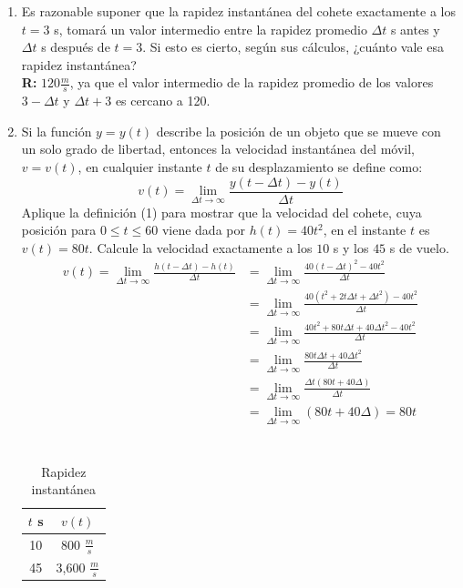 \documentclass[12pt]{article}
\begin{document}
\begin{enumerate}
\item Es razonable suponer que la rapidez instantánea del cohete exactamente a los $t = 3$ s, tomará un valor intermedio entre la rapidez promedio $\Delta t$ s antes y $\Delta t$ s después de $t = 3$. Si esto es cierto, según sus cálculos, ¿cuánto vale esa rapidez instantánea?\\
{\bf R:} $120 \frac{m}{s}$, ya que el valor intermedio de la rapidez promedio de los valores $3- \Delta t$ y $\Delta t +3$ es cercano a 120.
\item Si la función $y = y(t)$ describe la posición de un objeto que se mueve con un solo grado de libertad, entonces la velocidad instantánea del móvil, $v = v(t)$, en cualquier instante $t$ de su desplazamiento se define como:
  \begin{equation}
    v(t) = \lim_{\Delta t \rightarrow \infty}\frac{y(t - \Delta t) - y(t)}{\Delta t}
  \end{equation}
  Aplique la definición (1) para mostrar que la velocidad del cohete, cuya posición para $0 \leq t \leq 60$ viene dada por $h(t) = 40t^2$, en el instante $t$ es $v(t) = 80t$. Calcule la velocidad exactamente a los $10$ s y los $45$ s de vuelo.
\begin{align*}
v(t) = \lim_{\Delta t \rightarrow \infty}\frac{h(t - \Delta t) - h(t)}{\Delta t}&= \lim_{\Delta t \rightarrow \infty}\frac{40(t - \Delta t)^2 - 40t^2}{\Delta t}\\
&=\lim_{\Delta t \rightarrow \infty}\frac{40(t^2+2t\Delta t + \Delta t^2) - 40t^2}{\Delta t}\\
&=\lim_{\Delta t \rightarrow \infty}\frac{40t^2+80t\Delta t + 40\Delta t^2 - 40t^2}{\Delta t}\\
&=\lim_{\Delta t \rightarrow \infty}\frac{80t\Delta t + 40\Delta t^2}{\Delta t}\\
&=\lim_{\Delta t \rightarrow \infty}\frac{\Delta t(80t+ 40\Delta)}{\Delta t}\\
&=\lim_{\Delta t \rightarrow \infty}(80t+ 40\Delta) = 80t\\
\end{align*}\\
 \begin{table}[h]
\begin{center}
\begin{tabular}{| c | c |}\hline %
  $t$ s & $v(t)$\\ \hline
10 & 800 $\frac{m}{s}$\\ 
45& 3,600 $\frac{m}{s}$  \\ \hline
\end{tabular}
\caption{Rapidez instantánea} 
\label{tab:rapinst}
\end{center}
\end{table}
\end{enumerate}
\end{document}
